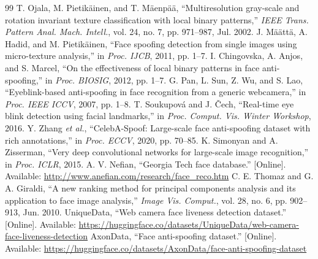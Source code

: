 \documentclass[conference,a4paper]{IEEEtran}
\begin{document}
\begin{thebibliography}{99}
 T. Ojala, M. Pietik\"ainen, and T. M\"aenp\"a\"a, ``Multiresolution gray-scale and rotation invariant texture classification with local binary patterns,'' \emph{IEEE Trans. Pattern Anal. Mach. Intell.}, vol. 24, no. 7, pp. 971--987, Jul. 2002.
 J. M\"a\"att\"a, A. Hadid, and M. Pietik\"ainen, ``Face spoofing detection from single images using micro-texture analysis,'' in \emph{Proc. IJCB}, 2011, pp. 1--7.
 I. Chingovska, A. Anjos, and S. Marcel, ``On the effectiveness of local binary patterns in face anti-spoofing,'' in \emph{Proc. BIOSIG}, 2012, pp. 1--7.
 G. Pan, L. Sun, Z. Wu, and S. Lao, ``Eyeblink-based anti-spoofing in face recognition from a generic webcamera,'' in \emph{Proc. IEEE ICCV}, 2007, pp. 1--8.
 T. Soukupov\'a and J. \v{C}ech, ``Real-time eye blink detection using facial landmarks,'' in \emph{Proc. Comput. Vis. Winter Workshop}, 2016.
 Y. Zhang \emph{et al.}, ``CelebA-Spoof: Large-scale face anti-spoofing dataset with rich annotations,'' in \emph{Proc. ECCV}, 2020, pp. 70--85.
 K. Simonyan and A. Zisserman, ``Very deep convolutional networks for large-scale image recognition,'' in \emph{Proc. ICLR}, 2015.
 A. V. Nefian, ``Georgia Tech face database.'' [Online]. Available: \url{http://www.anefian.com/research/face_reco.htm}
 C. E. Thomaz and G. A. Giraldi, ``A new ranking method for principal components analysis and its application to face image analysis,'' \emph{Image Vis. Comput.}, vol. 28, no. 6, pp. 902--913, Jun. 2010.
 UniqueData, ``Web camera face liveness detection dataset.'' [Online]. Available: \url{https://huggingface.co/datasets/UniqueData/web-camera-face-liveness-detection}
 AxonData, ``Face anti-spoofing dataset.'' [Online]. Available: \url{https://huggingface.co/datasets/AxonData/face-anti-spoofing-dataset}
\end{thebibliography}
\end{document}
